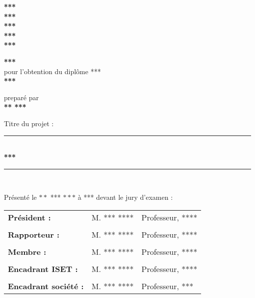 \begin{titlepage}
\newcommand{\HRule}{\rule{\linewidth}{0.35mm}} %
\begin{flushleft}
{\scriptsize
\textbf{\large{***}}\\
\textbf{\large{***}}\\
\textbf{\large{***}}\\
\textbf{\large{***}}\\
\textbf{\large{***}}}
\end{flushleft}
\begin{center}
\textbf{\textsc{\huge{***}}}\\
pour l'obtention du diplôme ***\\
\textbf{\textsc{\large{***}}}\\
\end{center}
\begin{center}
preparé par\\
\textbf{{\large *** \textsc{***}}}\\
\end{center}
\begin{center}
Titre du projet :\\
\HRule \\[0.3cm]
\Huge{\textbf{***}}\\[0.2cm]
\HRule \\%
\end{center}
\begin{center}
Présenté le $**$ *** $***$ à *** devant le jury d'examen :\\
\end{center}
\begin{center}
\begin{tabular}{lll}
\textbf{Président :} & \textsc{M. *** ****} & Professeur, \textsc{****}
\tabularnewline
\tabularnewline
\textbf{Rapporteur :} & \textsc{M. *** ****} & Professeur, \textsc{****}
\tabularnewline
\tabularnewline
\textbf{Membre :} & \textsc{M. *** ****} & Professeur, \textsc{****} 
\tabularnewline
\tabularnewline
\textbf{Encadrant \textsc{ISET} :} & \textsc{M. *** ****} & Professeur, \textsc{****}
\tabularnewline
\tabularnewline
\textbf{Encadrant société :} & \textsc{M. *** ****} & Professeur, \textsc{***}
\end{tabular}
\end{center}
\sloppy
\end{titlepage}
